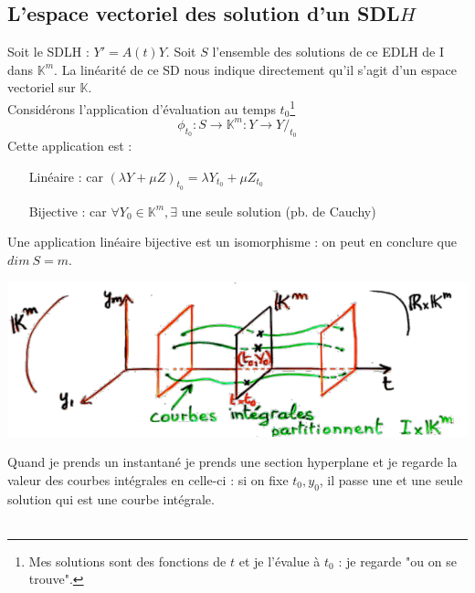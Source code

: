 \documentclass[11pt, a4paper, openany]{book}
\begin{document}
\subsection{L'espace vectoriel des solution d'un SDL$H$}
Soit le SDLH : $Y' = A(t)Y$. Soit $S$ l'ensemble des solutions de ce EDLH de I dans $\mathbb{K}^m$. La linéarité de ce SD nous indique directement qu'il s'agit d'un espace vectoriel sur $\mathbb{K}$.\\
Considérons l'application d'évaluation au temps $t_0$\footnote{Mes solutions sont des fonctions de $t$ et je l'évalue à $t_0$ : je regarde "ou on se trouve".}
\begin{equation}
	\phi_{t_0} : S \rightarrow \mathbb{K}^m : Y \rightarrow Y/_{t_0}
\end{equation}
Cette application est :
\begin{itemize}
	\item[Linéaire :] car $(\lambda Y + \mu Z)_{t_0} = \lambda Y_{t_0} + \mu Z_{t_0}$
	\item[Bijective :] car $\forall Y_0 \in \mathbb{K}^m, \exists$ une seule solution (pb. de Cauchy)
\end{itemize}
Une application linéaire bijective est un isomorphisme : on peut en conclure que $dim\ S = m$.\\
\begin{center}
	\includegraphics[scale=0.45]{image6.png}
\end{center}
		
Quand je prends un instantané je prends une section hyperplane et je regarde la valeur des courbes intégrales en celle-ci : si on fixe $t_0, y_0$, il passe une et une seule solution qui est une courbe intégrale.\\
		
\ \\
		
\end{document}

